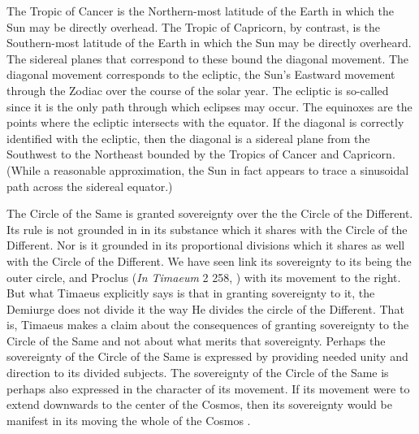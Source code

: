 The Tropic of Cancer is the Northern-most latitude of the Earth in which the Sun may be directly overhead. The Tropic of Capricorn, by contrast, is the Southern-most latitude of the Earth in which the Sun may be directly overheard. The sidereal planes that correspond to these bound the diagonal movement. The diagonal movement corresponds to the ecliptic, the Sun's Eastward movement through the Zodiac over the course of the solar year. The ecliptic is so-called since it is the only path through which eclipses may occur. The equinoxes are the points where the ecliptic intersects with the equator. If the diagonal is correctly identified with the ecliptic, then the diagonal is a sidereal plane from the Southwest to the Northeast bounded by the Tropics of Cancer and Capricorn. (While a reasonable approximation, the Sun in fact appears to trace a sinusoidal path across the sidereal equator.)

The Circle of the Same is granted sovereignty over the the Circle of the Different. Its rule is not grounded in in its substance which it shares with the Circle of the Different. Nor is it grounded in its proportional divisions which it shares as well with the Circle of the Different. We have seen \citet[112 n3]{Archer-Hind:1888qd} link its sovereignty to its being the outer circle, and Proclus (\emph{In Timaeum} 2 258, \citealt{Diehl:1903re}) with its movement to the right. But what Timaeus explicitly says is that in granting sovereignty to it, the Demiurge does not divide it the way He divides the circle of the Different. That is, Timaeus makes a claim about the consequences of granting sovereignty to the Circle of the Same and not about what merits that sovereignty. Perhaps the sovereignty of the Circle of the Same is expressed by providing needed unity and direction to its divided subjects. The sovereignty of the Circle of the Same is perhaps also expressed in the character of its movement. If its movement were to extend downwards to the center of the Cosmos, then its sovereignty would be manifest in its moving the whole of the Cosmos \citep[76]{Cornford:1935fk}.

